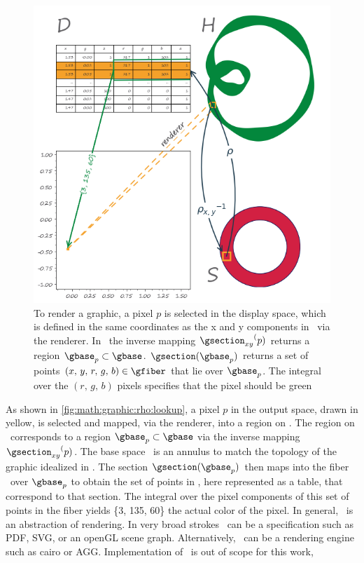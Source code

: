 \documentclass[../main.tex]{subfiles}
\begin{document}
\begin{figure}[H]
    \includegraphics[width=\textwidth]{figures/math/render.png}
    \caption{To render a graphic, a pixel $p$ is selected in the display space, which is defined in the same coordinates as the x and y components in \gfiber\ via the renderer. In \gtotal\, the inverse mapping ${\gsection_{xy}}^(p)$ returns a region $\gbase_{p} \subset \gbase$. $\gsection(\gbase_{p})$ returns a set of points $(x,\,y,\,r,\,g,\,b) \in \gfiber$ that lie over $\gbase_{p}$. The integral over the $(r,\,g,\,b)$ pixels specifies that the pixel should be green}
    \label{fig:math:graphic:rho:lookup}
\end{figure}

As shown in \autoref{fig:math:graphic:rho:lookup}, a pixel $p$ in the output space, drawn in yellow, is selected and mapped, via the renderer, into a region on \gtotal.  The region on \gtotal\ corresponds to a region $\gbase_p \subset \gbase$ via the inverse mapping  ${\gsection_{xy}}^(p)$. The base space \gbase\ is an annulus to match the topology of the graphic idealized in \gtotal. The section  $\gsection(\gbase_{p})$  then maps into the fiber \gfiber\ over $\gbase_p$ to obtain the set of points in \gfiber, here represented as a table, that correspond to that section. The integral over the pixel components of this set of points in the fiber yields \{3, 135, 60\} the actual color of the pixel. In general, \gsection\ is an abstraction of rendering. In very broad strokes \gsection\  can be a specification such as PDF\cite{bienz1993portable}, SVG\cite{quintScalable2003}, or an openGL scene graph\cite{CarsonOpenGL1997}. Alternatively, \gsection\ can be a rendering engine such as cairo\cite{CairographicsOrg} or AGG\cite{shemanarevAntiGrainGeometry}. Implementation of \gsection\ is out of scope for this work,
\end{document}
